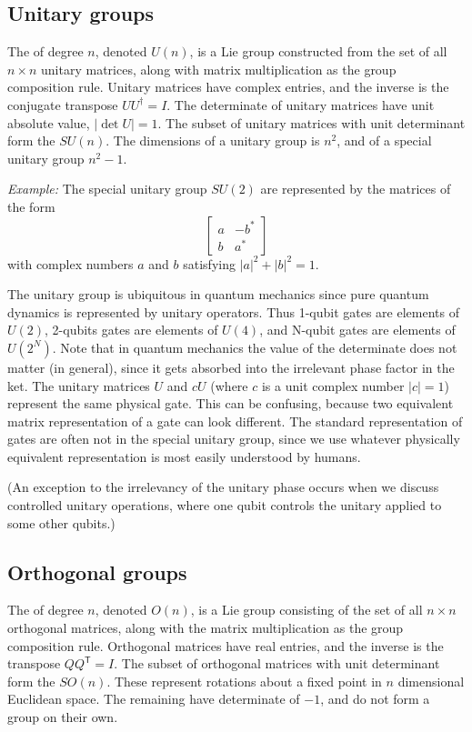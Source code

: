\subsection{Unitary groups}
The  of degree $n$, denoted $U(n)$, is a Lie group constructed from the set of all $n\times n$ unitary matrices, along with  matrix multiplication as the group composition rule. Unitary matrices have complex entries, and the inverse is the conjugate transpose $UU^\dagger=I$. The determinate of unitary matrices have unit absolute value, $|\det U|=1$. The subset of unitary matrices with unit determinant form the  $SU(n)$. The dimensions of a unitary group is $n^2$, and of a special unitary group $n^2-1$.


{\sl Example:} The special unitary group $SU(2)$ are represented by the matrices of the form
\[
\begin{bmatrix}
a & -b^* \\
b & a^*
\end{bmatrix}
\]
with complex numbers $a$ and $b$ satisfying $|a|^2 + |b|^2 = 1$.

The unitary group is ubiquitous in quantum mechanics since pure quantum dynamics is represented by unitary operators. Thus 1-qubit gates are elements of $U(2)$, 2-qubits gates are elements of $U(4)$, and N-qubit gates are elements of $U(2^N)$. Note that in quantum mechanics the value of the determinate does not matter (in general), since it gets absorbed into the irrelevant phase factor in the ket. The unitary matrices $U$ and $cU$ (where $c$ is a unit complex number $|c|=1$) represent the same physical gate. This can be confusing, because two equivalent matrix representation of a gate can look different. The standard representation of gates are often not in the special unitary group, since we use whatever physically equivalent representation is most easily understood by humans. 

(An exception to the irrelevancy of the unitary phase occurs when we discuss controlled unitary operations, where one qubit controls the unitary applied to some other qubits.)


\newcommand{\T}{\mathsf{T}}

\subsection{Orthogonal groups}
The  of degree $n$, denoted $O(n)$, is a Lie group consisting of the set of all $n\times n$ orthogonal matrices, along with the matrix multiplication as the group composition rule. Orthogonal matrices have real entries, and the inverse is the transpose $QQ^\T=I$. The subset of orthogonal matrices with unit determinant form the  $SO(n)$. These represent rotations about a fixed point in $n$ dimensional Euclidean space. The remaining  have determinate of $-1$, and do not form a group on their own. 

